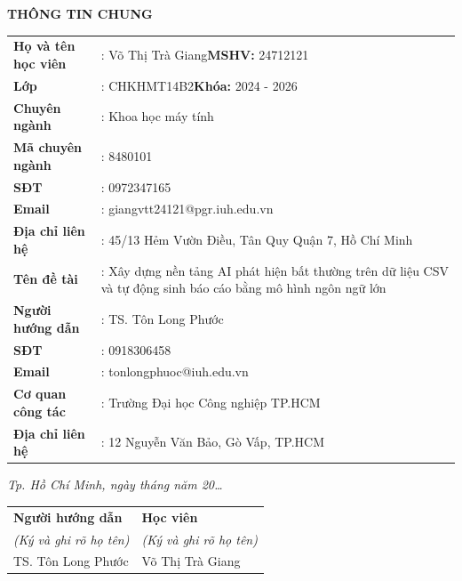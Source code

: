 \documentclass[12pt, a4paper, oneside]{report}
\makeatletter
\newcommand{\TenDeTaiVI}{Xây dựng nền tảng AI phát hiện bất thường trên dữ liệu CSV và tự động sinh báo cáo bằng mô hình ngôn ngữ lớn}
\newcommand{\HoTenHV}{Võ Thị Trà Giang}
\newcommand{\MSHV}{24712121}
\newcommand{\LopHV}{CHKHMT14B2}
\newcommand{\KhoaHoc}{2024 - 2026}
\newcommand{\ChuyenNganh}{Khoa học máy tính}
\newcommand{\MaCN}{8480101}
\newcommand{\SDTHocVien}{0972347165}
\newcommand{\EmailHocVien}{giangvtt24121@pgr.iuh.edu.vn}
\newcommand{\DiaChiHV}{45/13 Hẻm Vườn Điều, Tân Quy Quận 7, Hồ Chí Minh}
\newcommand{\TenGVHD}{TS. Tôn Long Phước}
\newcommand{\SDTGiangVien}{0918306458}
\newcommand{\EmailGiangVien}{tonlongphuoc@iuh.edu.vn}
\newcommand{\CoQuanGVHD}{Trường Đại học Công nghiệp TP.HCM}
\newcommand{\DiaChiGVHD}{12 Nguyễn Văn Bảo, Gò Vấp, TP.HCM}
\makeatother
\begin{document}
\begin{center}
  {\fontsize{14pt}{17pt}\selectfont\bfseries THÔNG TIN CHUNG}
\end{center}

\vspace{1cm}
\setlength{\parskip}{0pt}

\noindent
\begin{tabularx}{\textwidth}{@{}lX@{}}
\textbf{Họ và tên học viên} & : \HoTenHV \hfill \textbf{MSHV:} \MSHV \\[6pt]
\textbf{Lớp}               & : \LopHV   \hfill \textbf{Khóa:} \KhoaHoc \\[6pt]
\textbf{Chuyên ngành}      & : \ChuyenNganh \\[6pt]
\textbf{Mã chuyên ngành}   & : \MaCN \\[6pt]
\textbf{SĐT}               & : \SDTHocVien \\[6pt]
\textbf{Email}             & : \EmailHocVien \\[6pt]
\textbf{Địa chỉ liên hệ}  & : \DiaChiHV \\[12pt]
\textbf{Tên đề tài}        & : \TenDeTaiVI \\[12pt]
\textbf{Người hướng dẫn}   & : \TenGVHD \\[6pt]
\textbf{SĐT}               & : \SDTGiangVien \\[6pt]
\textbf{Email}             & : \EmailGiangVien \\[6pt]
\textbf{Cơ quan công tác}  & : \CoQuanGVHD \\[6pt]
\textbf{Địa chỉ liên hệ}  & : \DiaChiGVHD \\[6pt]
\end{tabularx}

\vfill

\begin{flushright}
\textit{Tp. Hồ Chí Minh, ngày \hspace{1cm} tháng \hspace{1cm} năm 20\ldots}
\end{flushright}

\vspace{1.5cm}

\noindent
\begin{tabularx}{\textwidth}{>{\centering\arraybackslash}X
                              >{\centering\arraybackslash}X}
\textbf{Người hướng dẫn}             & \textbf{Học viên} \\[2pt]
\textit{(Ký và ghi rõ họ tên)}       & \textit{(Ký và ghi rõ họ tên)} \\[3cm]
\TenGVHD                             & \HoTenHV \\
\end{tabularx}
\end{document}
